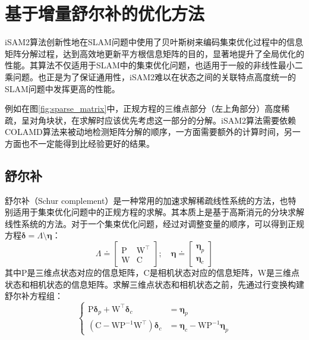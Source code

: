 \section{基于增量舒尔补的优化方法}

iSAM2算法\cite{kaess2008isam,kaess2012isam2}创新性地在SLAM问题中使用了贝叶斯树来编码集束优化过程中的信息矩阵分解过程，达到高效地更新平方根信息矩阵的目的，显著地提升了全局优化的性能。其算法不仅适用于SLAM中的集束优化问题，也适用于一般的非线性最小二乘问题。也正是为了保证通用性，iSAM2难以在状态之间的关联特点高度统一的SLAM问题中发挥更高的性能。

例如在图\ref{fig:sparse_matrix}中，正规方程的三维点部分（左上角部分）高度稀疏，呈对角块状，在求解时应该优先考虑这一部分的分解。iSAM2算法需要依赖COLAMD\citep{davis2004algorithm}算法来被动地检测矩阵分解的顺序，一方面需要额外的计算时间，另一方面也不一定能得到比经验更好的结果。

\subsection{舒尔补}

舒尔补（Schur complement）是一种常用的加速求解稀疏线性系统的方法，也特别适用于集束优化问题中的正规方程的求解。其本质上是基于高斯消元的分块求解线性系统的方法。对于一个集束优化问题，经过对调整变量的顺序，可以得到正规方程$\bm{\delta} =\Lambda\setminus\bm{\eta}$：
\begin{equation}
    \Lambda \doteq
    \begin{bmatrix}
        \mathrm{P} & \mathrm{W}^\top \\
        \mathrm{W} & \mathrm{C}
    \end{bmatrix};
    \quad
    \bm{\eta} \doteq
    \begin{bmatrix} \bm{\eta}_p \\ \bm{\eta}_c \end{bmatrix}
\end{equation}
其中$\mathrm{P}$是三维点状态对应的信息矩阵，$\mathrm{C}$是相机状态对应的信息矩阵，$\mathrm{W}$是三维点状态和相机状态的信息矩阵。求解三维点状态和相机状态之前，先通过行变换构建舒尔补方程组：
\begin{equation}
    \left\{
        \begin{array}{rl}
            \mathrm{P} \bm{\delta}_p + \mathrm{W}^\top \bm{\delta}_c &= \bm{\eta}_p \\
            \left( \mathrm{C}-\mathrm{W}\mathrm{P}^{-1}\mathrm{W}^\top \right) \bm{\delta}_c &= \bm{\eta}_c-\mathrm{W}\mathrm{P}^{-1}\bm{\eta}_p
        \end{array}
    \right.
    \label{eq:schur_complement}
\end{equation}

